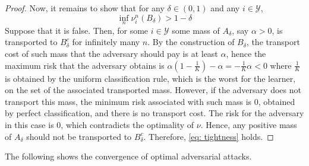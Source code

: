 \documentclass{amsart}
\theoremstyle{plain}
\numberwithin{equation}{section}\newtheorem{theorem}{Theorem}[section]
\theoremstyle{remark}
\begin{document}
\begin{proof}
Now, it remains to show that for any $\delta \in (0,1)$ and any $i \in \mathcal{Y}$,
\begin{equation}\label{eq: tightness}
    \inf_{n} \nu_i^n (B_{\delta}) > 1- \delta
\end{equation}
Suppose that it is false. Then, for some $i \in \mathcal{Y}$ some mass of $A_{\delta}$, say $\alpha > 0$, is transported to $B_{\delta}^c$ for infinitely many $n$. By the construction of $B_\delta$, the transport cost of such mass that the adversary should pay is at least $\alpha$, hence the maximum risk that the adversary obtains is $\alpha(1-\frac{1}{K}) - \alpha = -\frac{1}{K} \alpha < 0$ where $\frac{1}{K}$ is obtained by the uniform classification rule, which is the worst for the learner, on the set of the associated transported mass. However, if the adversary does not transport this mass, the minimum risk associated with such mass is $0$, obtained by perfect classification, and there is no transport cost. The risk for the adversary in this case is $0$, which contradicts the optimality of $\nu$. Hence, any positive mass of $A_\delta$ should not be transported to $B_{\delta}^c$. Therefore, \eqref{eq: tightness} holds.
\end{proof}








The following shows the convergence of optimal adversarial attacks.
\end{document}
